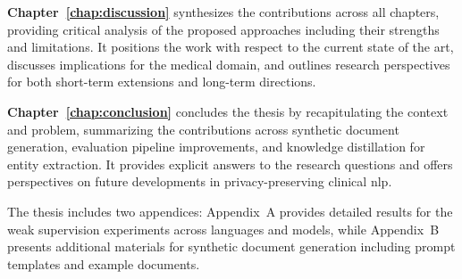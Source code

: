\textbf{Chapter~\ref{chap:discussion}} synthesizes the contributions across all chapters, providing critical analysis of the proposed approaches including their strengths and limitations. It positions the work with respect to the current state of the art, discusses implications for the medical domain, and outlines research perspectives for both short-term extensions and long-term directions.

\textbf{Chapter~\ref{chap:conclusion}} concludes the thesis by recapitulating the context and problem, summarizing the contributions across synthetic document generation, evaluation pipeline improvements, and knowledge distillation for entity extraction. It provides explicit answers to the research questions and offers perspectives on future developments in privacy-preserving clinical \gls{nlp}.

The thesis includes two appendices: Appendix~A provides detailed results for the weak supervision experiments across languages and models, while Appendix~B presents additional materials for synthetic document generation including prompt templates and example documents.
